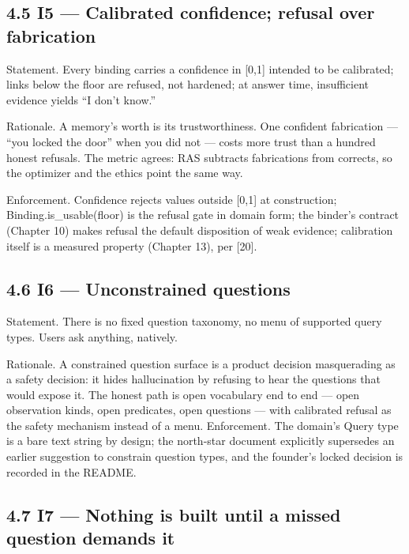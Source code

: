 \subsection{4.5 I5 --- Calibrated confidence; refusal over fabrication}\label{i5-calibrated-confidence-refusal-over-fabrication}

Statement. Every binding carries a confidence in {[}0,1{]} intended to be calibrated; links below the floor are refused, not hardened; at answer time, insufficient evidence yields ``I don't know.''

Rationale. A memory's worth is its trustworthiness. One confident fabrication --- ``you locked the door'' when you did not --- costs more trust than a hundred honest refusals. The metric agrees: RAS subtracts fabrications from corrects, so the optimizer and the ethics point the same way.

Enforcement. Confidence rejects values outside {[}0,1{]} at construction; Binding.is\_usable(floor) is the refusal gate in domain form; the binder's contract (Chapter 10) makes refusal the default disposition of weak evidence; calibration itself is a measured property (Chapter 13), per {[}20{]}.

\subsection{4.6 I6 --- Unconstrained questions}\label{i6-unconstrained-questions}

Statement. There is no fixed question taxonomy, no menu of supported query types. Users ask anything, natively.

Rationale. A constrained question surface is a product decision masquerading as a safety decision: it hides hallucination by refusing to hear the questions that would expose it. The honest path is open vocabulary end to end --- open observation kinds, open predicates, open questions --- with calibrated refusal as the safety mechanism instead of a menu. Enforcement. The domain's Query type is a bare text string by design; the north-star document explicitly supersedes an earlier suggestion to constrain question types, and the founder's locked decision is recorded in the README.

\subsection{4.7 I7 --- Nothing is built until a missed question demands it}\label{i7-nothing-is-built-until-a-missed-question-demands-it}

